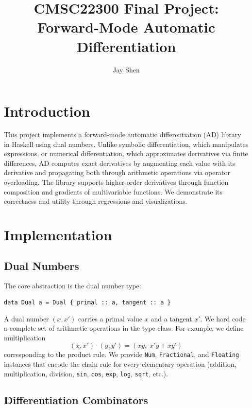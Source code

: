 \documentclass{article}
\title{CMSC22300 Final Project: Forward-Mode Automatic Differentiation}
\author{Jay Shen}
\date{}
\begin{document}
\maketitle

\section{Introduction}

This project implements a forward-mode automatic differentiation (AD) library in Haskell using dual numbers. Unlike symbolic differentiation, which manipulates expressions, or numerical differentiation, which approximates derivatives via finite differences, AD computes exact derivatives by augmenting each value with its derivative and propagating both through arithmetic operations via operator overloading. The library supports higher-order derivatives through function composition and gradients of multivariable functions. We demonstrate its correctness and utility through regressions and visualizations.

\section{Implementation}

\subsection{Dual Numbers}

The core abstraction is the dual number type:
\begin{verbatim}
data Dual a = Dual { primal :: a, tangent :: a }
\end{verbatim}
A dual number $( x, x' )$ carries a primal value $x$ and a tangent $x'$. We hard code a complete set of arithmetic operations in the type class. For example, we define multiplication
\[
(x, x') \cdot (y, y') = ( xy,\; x'y + xy' )
\]
corresponding to the product rule. We provide \texttt{Num}, \texttt{Fractional}, and \texttt{Floating} instances that encode the chain rule for every elementary operation (addition, multiplication, division, \texttt{sin}, \texttt{cos}, \texttt{exp}, \texttt{log}, \texttt{sqrt}, etc.).

\subsection{Differentiation Combinators}
\end{document}
